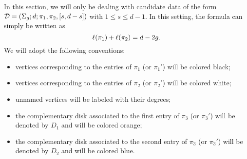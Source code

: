 In this section, we will only be dealing with candidate data of the form $\mathcal{D}=(\Sigma_{g};d;\pi_1,\pi_2,[s,d-s])$ with $1\le s\le d-1$. In this setting, the \RH{} formula can simply be written as
\[
\ell(\pi_1)+\ell(\pi_2)=d-2g.
\]
We will adopt the following conventions:
\begin{itemize}
\item vertices corresponding to the entries of $\pi_1$ (or $\pi_1'$) will be colored black;
\item vertices corresponding to the entries of $\pi_2$ (or $\pi_2'$) will be colored white;
\item unnamed vertices will be labeled with their degrees;
\item the complementary disk associated to the first entry of $\pi_3$ (or $\pi_3'$) will be denoted by $D_1$ and will be colored orange;
\item the complementary disk associated to the second entry of $\pi_3$ (or $\pi_3'$) will be denoted by $D_2$ and will be colored blue.
\end{itemize}

